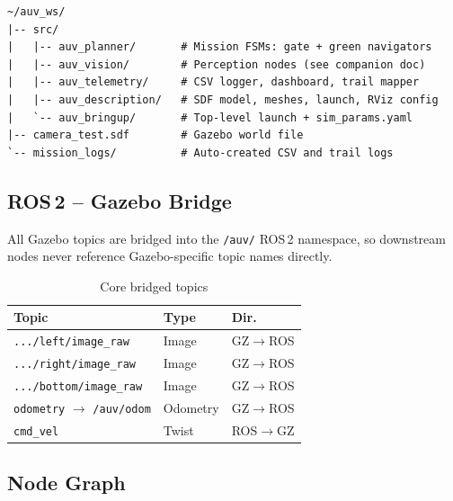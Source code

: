 \documentclass[11pt,a4paper]{article}
\begin{document}
\begin{lstlisting}[style=cleanbash, caption={AUV workspace structure (active packages)}]
~/auv_ws/
|-- src/
|   |-- auv_planner/       # Mission FSMs: gate + green navigators
|   |-- auv_vision/        # Perception nodes (see companion doc)
|   |-- auv_telemetry/     # CSV logger, dashboard, trail mapper
|   |-- auv_description/   # SDF model, meshes, launch, RViz config
|   `-- auv_bringup/       # Top-level launch + sim_params.yaml
|-- camera_test.sdf        # Gazebo world file
`-- mission_logs/          # Auto-created CSV and trail logs
\end{lstlisting}

\subsection{ROS\,2 -- Gazebo Bridge}

All Gazebo topics are bridged into the \texttt{/auv/} ROS\,2 namespace, so
downstream nodes never reference Gazebo-specific topic names directly.

\begin{table}[H]
\centering
\caption{Core bridged topics}
\begin{tabular}{L{5.6cm} L{3.4cm} C{1.6cm}}
  \toprule
  \textbf{Topic} & \textbf{Type} & \textbf{Dir.} \\
  \midrule
  \texttt{.../left/image\_raw}   & Image    & GZ$\to$ROS \\
  \texttt{.../right/image\_raw}  & Image    & GZ$\to$ROS \\
  \texttt{.../bottom/image\_raw} & Image    & GZ$\to$ROS \\
  \texttt{odometry} $\to$ \texttt{/auv/odom} & Odometry & GZ$\to$ROS \\
  \texttt{cmd\_vel}              & Twist    & ROS$\to$GZ \\
  \bottomrule
\end{tabular}
\end{table}

\subsection{Node Graph}
\end{document}
